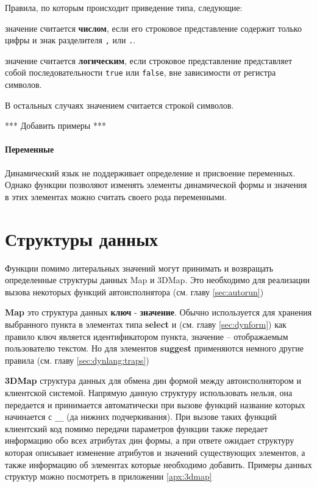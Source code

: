 \documentclass[../index.tex]{subfiles}
\begin{document}

Правила, по которым происходит приведение типа, следующие:

значение считается \textbf{числом}, если его строковое представление содержит только цифры и знак разделителя \verb|,| или \verb|.|.

значение считается  \textbf{логическим}, если строковое представление представляет собой последовательности \verb|true| или
 \verb|false|, вне зависимости от регистра символов.

В остальных случаях значением считается строкой символов.

*** Добавить примеры ***

\paragraph{Переменные}
Динамический язык не поддерживает определение и присвоение переменных. Однако функции позволяют изменять элементы 
динамической формы и значения в этих элементах можно считать своего рода переменными.

\section{Структуры данных}
Функции помимо литеральных значений могут принимать и возвращать определенные структуры данных Map и 3DMap.
Это необходимо для реализации вызова некоторых функций автоисполнятора (см. главу \ref{sec:autorun})

\textbf{Map} это структура данных \textbf{ключ} - \textbf{значение}. 
Обычно используется для хранения выбранного пункта в элементах типа \textbf{select} 
и  (см. главу \ref{sec:dynform}) 
как правило ключ является идентификатором пункта, значение -- отображаемым пользователю текстом. Но для элементов
\textbf{suggest} применяются немного другие правила (см. главу \ref{sec:dynlang:traps})

\textbf{3DMap} структура данных для обмена дин формой между автоисполнятором и клиентской системой. 
Напрямую данную структуру использовать нельзя, она передается и принимается автоматически при вызове функций
название которых начинается с \verb|__| (да нижних подчеркивания). При вызове таких функций клиентский код помимо передачи 
параметров функции также передает информацию обо всех атрибутах дин формы, а при ответе ожидает структуру которая описывает
изменение атрибутов и значений существующих элементов, а также информацию об элементах которые необходимо добавить.
Примеры данных структур можно посмотреть в приложении \ref{apx:3dmap}
\end{document}
